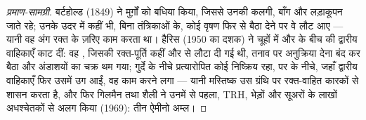 \begin{proof}[प्रमाण-सामग्री]
बर्टहोल्ड (1849) ने मुर्ग़ों को बधिया किया, जिससे उनकी कलगी, बाँग और
लड़ाकूपन जाते रहे; उनके उदर में कहीं भी, बिना तंत्रिकाओं के, कोई वृषण
फिर से बैठा देने पर वे लौट आए --- यानी वह अंग रक्त के ज़रिए काम करता
था। हैरिस (1950 का दशक) ने चूहों में  और  के बीच की
द्वारीय वाहिकाएँ काट दीं: वह , जिसकी रक्त-पूर्ति कहीं और से लौटा
दी गई थी, तनाव पर अनुक्रिया देना बंद कर बैठा और अंडाशयों का चक्र थम
गया; गुर्दे के नीचे प्रत्यारोपित कोई  निष्क्रिय रहा, पर 
के नीचे, जहाँ द्वारीय वाहिकाएँ फिर उसमें उग आईं, वह काम करने लगा ---
यानी मस्तिष्क उस ग्रंथि पर रक्त-वाहित कारकों से शासन करता है, और फिर
गिलमैन तथा शैली ने उनमें से पहला, TRH, भेड़ों और सूअरों के लाखों
अधश्चेतकों से अलग किया (1969): तीन ऐमीनो अम्ल।
\end{proof}

